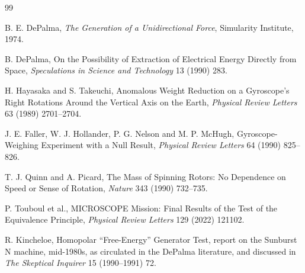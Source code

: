 \documentclass[11pt]{article}
\begin{document}
\begin{thebibliography}{99}

 B. E. DePalma, \emph{The Generation of a Unidirectional Force}, Simularity Institute, 1974.

 B. DePalma, On the Possibility of Extraction of Electrical Energy Directly from Space, \emph{Speculations in Science and Technology} 13 (1990) 283.

 H. Hayasaka and S. Takeuchi, Anomalous Weight Reduction on a Gyroscope's Right Rotations Around the Vertical Axis on the Earth, \emph{Physical Review Letters} 63 (1989) 2701--2704.

 J. E. Faller, W. J. Hollander, P. G. Nelson and M. P. McHugh, Gyroscope-Weighing Experiment with a Null Result, \emph{Physical Review Letters} 64 (1990) 825--826.

 T. J. Quinn and A. Picard, The Mass of Spinning Rotors: No Dependence on Speed or Sense of Rotation, \emph{Nature} 343 (1990) 732--735.

 P. Touboul et al., MICROSCOPE Mission: Final Results of the Test of the Equivalence Principle, \emph{Physical Review Letters} 129 (2022) 121102.

 R. Kincheloe, Homopolar ``Free-Energy'' Generator Test, report on the Sunburst N machine, mid-1980s, as circulated in the DePalma literature, and discussed in \emph{The Skeptical Inquirer} 15 (1990--1991) 72.

\end{thebibliography}
\end{document}
